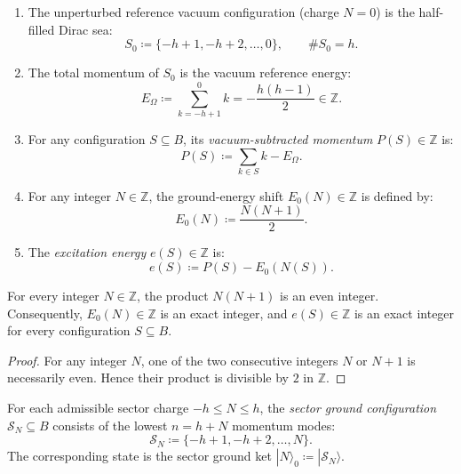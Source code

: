 \begin{definition}
\begin{enumerate}
    \item The unperturbed reference vacuum configuration (charge $N = 0$) is the half-filled Dirac sea:
    \begin{equation}
    S_0 \coloneqq \{-h+1, -h+2, \dots, 0\}, \qquad \#S_0 = h.
    \end{equation}
    \item The total momentum of $S_0$ is the vacuum reference energy:
    \begin{equation}
    E_\Omega \coloneqq \sum_{k=-h+1}^0 k = - \frac{h(h-1)}{2} \in \mathbb{Z}.
    \end{equation}
    \item For any configuration $S \subseteq B$, its \emph{vacuum-subtracted momentum} $P(S) \in \mathbb{Z}$ is:
    \begin{equation}
    P(S) \coloneqq \sum_{k \in S} k - E_\Omega.
    \end{equation}
    \item For any integer $N \in \mathbb{Z}$, the ground-energy shift $E_0(N) \in \mathbb{Z}$ is defined by:
    \begin{equation}
    E_0(N) \coloneqq \frac{N(N+1)}{2}.
    \end{equation}
    \item The \emph{excitation energy} $e(S) \in \mathbb{Z}$ is:
    \begin{equation}
    e(S) \coloneqq P(S) - E_0(N(S)).
    \end{equation}
\end{enumerate}
\end{definition}

\begin{lemma}
\label{lem:triangular_even}
For every integer $N \in \mathbb{Z}$, the product $N(N+1)$ is an even integer. Consequently, $E_0(N) \in \mathbb{Z}$ is an exact integer, and $e(S) \in \mathbb{Z}$ is an exact integer for every configuration $S \subseteq B$.
\end{lemma}

\begin{proof}
For any integer $N$, one of the two consecutive integers $N$ or $N+1$ is necessarily even. Hence their product is divisible by $2$ in $\mathbb{Z}$.
\end{proof}

\begin{definition}
For each admissible sector charge $-h \le N \le h$, the \emph{sector ground configuration} $\mathcal{S}_N \subseteq B$ consists of the lowest $n = h + N$ momentum modes:
\begin{equation}
\mathcal{S}_N \coloneqq \{-h+1, -h+2, \dots, N\}.
\end{equation}
The corresponding state is the sector ground ket $|N\rangle_0 \coloneqq |\mathcal{S}_N\rangle$.
\end{definition}

